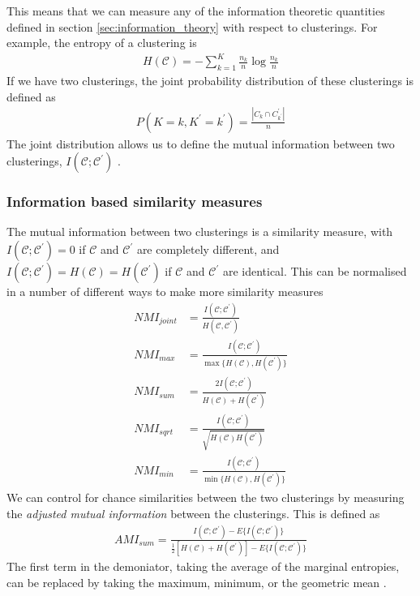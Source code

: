 \documentclass[a4paper,12pt]{article}
\theoremstyle{definition}
\begin{document}
      This means that we can measure any of the information theoretic quantities defined in section \ref{sec:information_theory} with respect to clusterings. For example, the entropy of a clustering is 
      \begin{align}
          H(\mathcal{C}) = - \sum_{k=1}^K \frac{n_k}{n} \log \frac{n_k}{n}
      \end{align}
      If we have two clusterings, the joint probability distribution of these clusterings is defined as
      \begin{align}
          P(K=k,K^{\prime}=k^{\prime}) = \frac{|C_k \cap C^{\prime}_{k^\prime}|}{n}
      \end{align}
      The joint distribution allows us to define the mutual information between two clusterings, $I(\mathcal{C};\mathcal{C}^{\prime})$ \cite{meila}.

      \subsubsection{Information based similarity measures}\label{sec:information_similarity_measures}
      The mutual information between two clusterings is a similarity measure, with $I(\mathcal{C};\mathcal{C}^{\prime}) = 0$ if $\mathcal{C}$ and $\mathcal{C}^{\prime}$ are completely different, and $I(\mathcal{C};\mathcal{C}^{\prime}) = H(\mathcal{C}) = H(\mathcal{C}^{\prime})$ if $\mathcal{C}$ and $\mathcal{C}^{\prime}$ are identical. This can be normalised in a number of different ways to make more similarity measures \cite{vinh}
      \begin{align}
          NMI_{joint} &= \frac{I(\mathcal{C};\mathcal{C}^{\prime})}{H(\mathcal{C}, \mathcal{C}^{\prime})} \\
          NMI_{max} &= \frac{I(\mathcal{C};\mathcal{C}^{\prime})}{\max \lbrace H(\mathcal{C}), H(\mathcal{C}^{\prime}) \rbrace} \\
          NMI_{sum} &= \frac{2I(\mathcal{C};\mathcal{C}^{\prime})}{H(\mathcal{C}) + H(\mathcal{C}^{\prime}) } \\
          NMI_{sqrt} &= \frac{I(\mathcal{C};\mathcal{C}^{\prime})}{\sqrt{H(\mathcal{C}) H(\mathcal{C}^{\prime}) }} \\
          NMI_{min} &= \frac{I(\mathcal{C};\mathcal{C}^{\prime})}{\min \lbrace H(\mathcal{C}), H(\mathcal{C}^{\prime}) \rbrace}
      \end{align}
      We can control for chance similarities between the two clusterings by measuring the \textit{adjusted mutual information} between the clusterings. This is defined as 
      \begin{align}
        AMI_{sum} = \frac{I(\mathcal{C};\mathcal{C}^{\prime}) - E \lbrace I(\mathcal{C};\mathcal{C}^{\prime}) \rbrace}{\frac{1}{2}\left[ H(\mathcal{C}) + H(\mathcal{C}^{\prime})\right] - E \lbrace I(\mathcal{C};\mathcal{C}^{\prime})  \rbrace}
      \end{align}
      The first term in the demoniator, taking the average of the marginal entropies, can be replaced by taking the maximum, minimum, or the geometric mean \cite{vinh}.
\end{document}
